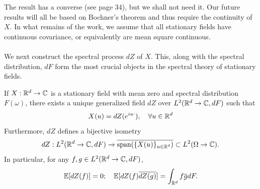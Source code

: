 \documentclass[
    a4paper,
    DIV=14,
    abstract=true,
    numbers=noenddot
]{scrartcl}
\begin{document}
The result has a converse (see \cite{lindgren2012stationary} page 34), but we shall not need it. Our future results will all be based on Bochner's theorem and thus require the continuity of $X$. In what remains of the work, we assume that all stationary fields have continuous covariance, or equivalently are mean square continuous.\\
\\
We next construct the spectral process $dZ$ of $X$. This, along with the spectral distribution, $dF$ form the most crucial objects in the spectral theory of stationary fields.
\begin{theorem}\label{spectral theorem}
	If $X:\mathbb{R}^d\to\mathbb{C}$ is a stationary field with mean zero and spectral distribution $F(\omega)$, there exists a unique generalized field $dZ$ over $L^2(\mathbb{R}^d\to\mathbb{C},dF)$ such that
	\begin{equation}\label{spectral representation}
		X(u)=dZ(e^{iu\cdot}),\quad\forall u\in\mathbb{R}^d
	\end{equation}
	Furthermore, $dZ$ defines a bijective isometry
	\begin{equation*}
		dZ:L^2(\mathbb{R}^d\to\mathbb{C},dF)\to\overline{\text{span}(\{X(u)\}_{u\in\mathbb{R}^d})}\subset L^2(\Omega\to\mathbb{C}).
	\end{equation*}
	In particular, for any $f,g\in L^2(\mathbb{R}^d\to\mathbb{C},dF)$,
	\begin{equation}\label{dZ properties}
		\mathbb{E}[dZ(f)]=0;\quad \mathbb{E}[dZ(f)\overline{dZ(g)}]=\int_{\mathbb{R}^d} f\overline{g}dF.
	\end{equation}
\end{theorem}
\end{document}
